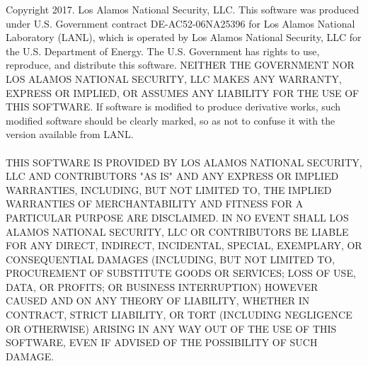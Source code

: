  Copyright 2017. Los Alamos National Security, LLC. This software was produced
 under U.S. Government contract DE-AC52-06NA25396 for Los Alamos National
 Laboratory (LANL), which is operated by Los Alamos National Security, LLC for
 the U.S. Department of Energy. The U.S. Government has rights to use,
 reproduce, and distribute this software.  NEITHER THE GOVERNMENT NOR LOS
 ALAMOS NATIONAL SECURITY, LLC MAKES ANY WARRANTY, EXPRESS OR IMPLIED, OR
 ASSUMES ANY LIABILITY FOR THE USE OF THIS SOFTWARE.  If software is
 modified to produce derivative works, such modified software should be
 clearly marked, so as not to confuse it with the version available from
 LANL.
\\
\\
 THIS SOFTWARE IS PROVIDED BY LOS ALAMOS NATIONAL SECURITY, LLC AND CONTRIBUTORS
 "AS IS" AND ANY EXPRESS OR IMPLIED WARRANTIES, INCLUDING, BUT NOT LIMITED TO,
 THE IMPLIED WARRANTIES OF MERCHANTABILITY AND FITNESS FOR A PARTICULAR PURPOSE
 ARE DISCLAIMED. IN NO EVENT SHALL LOS ALAMOS NATIONAL SECURITY, LLC OR
 CONTRIBUTORS BE LIABLE FOR ANY DIRECT, INDIRECT, INCIDENTAL, SPECIAL,
 EXEMPLARY, OR CONSEQUENTIAL DAMAGES (INCLUDING, BUT NOT LIMITED TO, PROCUREMENT
 OF SUBSTITUTE GOODS OR SERVICES; LOSS OF USE, DATA, OR PROFITS; OR BUSINESS
 INTERRUPTION) HOWEVER CAUSED AND ON ANY THEORY OF LIABILITY, WHETHER IN
 CONTRACT, STRICT LIABILITY, OR TORT (INCLUDING NEGLIGENCE OR OTHERWISE) ARISING
 IN ANY WAY OUT OF THE USE OF THIS SOFTWARE, EVEN IF ADVISED OF THE POSSIBILITY
 OF SUCH DAMAGE.